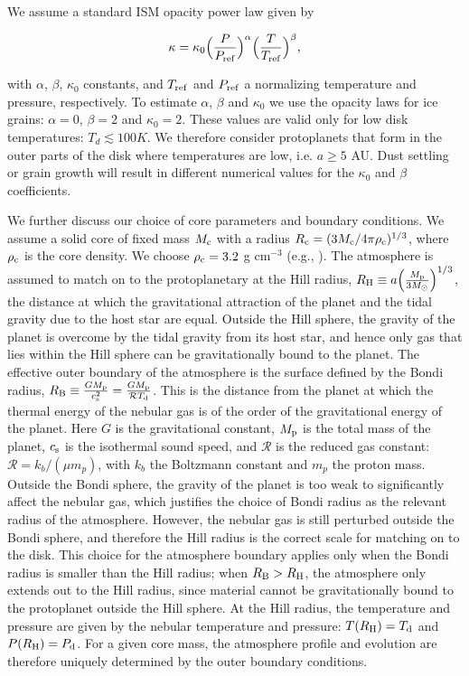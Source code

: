 \documentclass[apj]{emulateapj}
\newcommand{\di}{_{\rm d}}
\begin{document}
We assume a standard ISM opacity power law given by

\begin{equation}
\label{eq:opacitylaw}
\kappa=\kappa_0 \Big(\frac{P}{P_{\rm{ref}}}\Big)^{\alpha} \Big(\frac{T}{T_{\rm{ref}}}\Big)^{\beta},
\end{equation}  

\noindent with $\alpha$, $\beta$, $\kappa_0$ constants, and $T_{\rm{ref}}$ and $P_{\rm{ref}}$ a normalizing temperature and pressure, respectively. To estimate $\alpha$, $\beta$ and $\kappa_0$ we use the \citet{bell94} opacity laws for ice grains: $\alpha =0 $, $\beta=2$ and $\kappa_0=2$. These values are valid only for low disk temperatures: $T_d \lesssim 100 K$.  We therefore consider protoplanets that form in the outer parts of the disk where temperatures are low, i.e. $a \geq 5$ AU. Dust settling or grain growth will result in different numerical values for the $\kappa_0$ and $\beta$ coefficients.


We further discuss our choice of core parameters and boundary conditions. We assume a solid core of fixed mass $M_{\rm c}$ with a radius $R_{\rm c}=(3 M_{\rm c}/4 \pi \rho_{\rm c})^{1/3}$, where $\rho_{\rm c}$ is the core density. We choose $\rho_{\rm c}=3.2$ g cm$^{-3}$ (e.g., \citealt{pap99}). The atmosphere is assumed to match on to the protoplanetary at the Hill radius, $R_{\rm H} \equiv a \Big(\frac{M_{\rm p}}{3 M_{\odot}}\Big)^{1/3}$, the distance at which the gravitational attraction of the planet and the tidal gravity due to the host star are equal. Outside the Hill sphere, the gravity of the planet is overcome by the tidal gravity from its host star, and hence only gas that lies within the Hill sphere can be gravitationally bound to the planet. The effective outer boundary of the atmosphere is the surface defined by the Bondi radius, $R_{\rm B} \equiv \frac{G M_{\rm p}}{c_{\rm s}^2}=\frac{G M_{\rm p}}{\mathcal{R} T\di}$. This is the distance from the planet at which the thermal energy of the nebular gas is of the order of the gravitational energy of the planet. Here $G$ is the gravitational constant, $M_{\rm p}$ is the total mass of the planet, $c_{\rm s}$ is the isothermal sound speed, and $\mathcal{R}$ is the reduced gas constant: $\mathcal{R}=k_b/(\mu m_p)$, with $k_b$ the Boltzmann constant and $m_p$ the proton mass. Outside the Bondi sphere, the gravity of the planet is too weak to significantly affect the nebular gas, which justifies the choice of Bondi radius as the relevant radius of the atmosphere. However, the nebular gas is still perturbed outside the Bondi sphere, and therefore the Hill radius is the correct scale for matching on to the disk. This choice for the atmosphere boundary applies only when the Bondi radius is smaller than the Hill radius; when $R_{\rm B}>R_{\rm H}$, the atmosphere only extends out to the Hill radius, since material cannot be gravitationally bound to the protoplanet outside the Hill sphere. At the Hill radius, the temperature and pressure are given by the nebular temperature and pressure: $T(R_{\rm H})=T_{\rm d}$ and $P(R_{\rm H})=P_{\rm d}$. For a given core mass, the atmosphere profile and evolution are therefore uniquely determined by the outer boundary conditions. 
\end{document}
